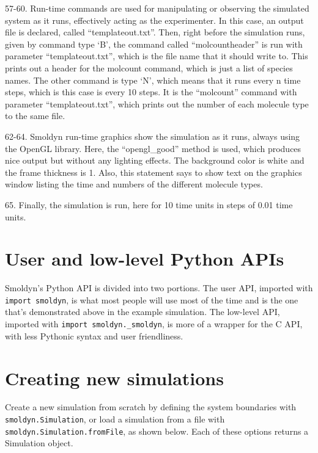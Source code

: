 \documentclass {scrbook}
\newcommand {\ttt} {\texttt}
\begin{document}
\begin{description}
\item{57-60.} Run-time commands are used for manipulating or observing the simulated system as it runs, effectively acting as the experimenter. In this case, an output file is declared, called ``templateout.txt''. Then, right before the simulation runs, given by command type `B', the command called ``molcountheader'' is run with parameter ``templateout.txt'', which is the file name that it should write to. This prints out a header for the molcount command, which is just a list of species names. The other command is type `N', which means that it runs every n time steps, which is this case is every 10 steps. It is the ``molcount'' command with parameter ``templateout.txt'', which prints out the number of each molecule type to the same file.

\item{62-64.} Smoldyn run-time graphics show the simulation as it runs, always using the OpenGL library. Here, the ``opengl\_good'' method is used, which produces nice output but without any lighting effects. The background color is white and the frame thickness is 1. Also, this statement says to show text on the graphics window listing the time and numbers of the different molecule types.

\item{65.} Finally, the simulation is run, here for 10 time units in steps of 0.01 time units.

\end{description}

\section{User and low-level Python APIs}

Smoldyn's Python API is divided into two portions. The user API, imported with \ttt{import smoldyn}, is what most people will use most of the time and is the one that's demonstrated above in the example simulation. The low-level API, imported with \ttt{import smoldyn.\_smoldyn}, is more of a wrapper for the C API, with less Pythonic syntax and user friendliness.

\section{Creating new simulations}

Create a new simulation from scratch by defining the system boundaries with \ttt{smoldyn.Simulation}, or load a simulation from a file with \ttt{smoldyn.Simulation.fromFile}, as shown below. Each of these options returns a Simulation object.
\end{document}
